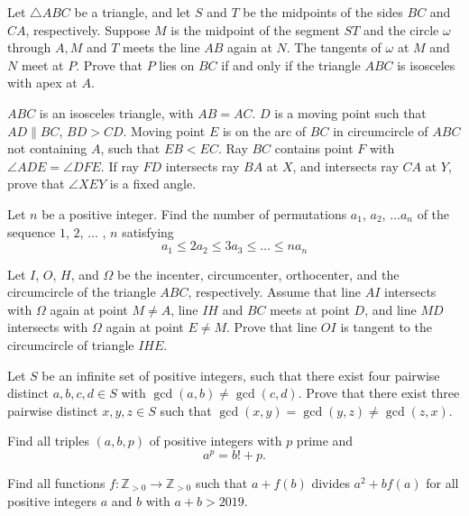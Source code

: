 \documentclass[11pt]{scrartcl}
\begin{document}
\begin{problem}[8639636622304457736]
Let $\triangle ABC$ be a triangle, and let $S$ and $T$ be the midpoints of the sides $BC$ and $CA$, respectively. Suppose $M$ is the midpoint of the segment $ST$ and the circle $\omega$ through $A, M$ and $T$ meets the line $AB$ again at $N$. The tangents of $\omega$ at $M$ and $N$ meet at $P$. Prove that $P$ lies on $BC$ if and only if the triangle $ABC$ is isosceles with apex at $A$.
\end{problem}
\begin{problem}[215375559035207]
$ABC$ is an isosceles triangle, with $AB=AC$. $D$ is a moving point such that $AD\parallel BC$, $BD>CD$. Moving point $E$ is on the arc of $BC$ in circumcircle of $ABC$ not containing $A$, such that $EB<EC$. Ray $BC$ contains point $F$ with $\angle ADE=\angle DFE$. If ray $FD$ intersects ray $BA$ at $X$, and intersects ray $CA$ at $Y$, prove that $\angle XEY$ is a fixed angle.
\end{problem}
\begin{problem}[233559801569582]
Let $n$ be a positive integer. Find the number of permutations $a_1$, $a_2$, $\dots a_n$ of the
sequence $1$, $2$, $\dots$ , $n$ satisfying
$$a_1 \le 2a_2\le 3a_3 \le \dots \le na_n$$
\end{problem}
\begin{problem}[183354438240037]
Let $I$, $O$, $H$, and $\Omega$ be the incenter, circumcenter, orthocenter, and the circumcircle of the triangle $ABC$, respectively. Assume that line $AI$ intersects with $\Omega$ again at point $M\neq A$, line $IH$ and $BC$ meets at point $D$, and line $MD$ intersects with $\Omega$ again at point $E\neq M$. Prove that line $OI$ is tangent to the circumcircle of triangle $IHE$.
\end{problem}
\begin{problem}[6783316811528119504]
Let $S$ be an infinite set of positive integers, such that there exist four pairwise distinct $a,b,c,d \in S$ with $\gcd(a,b) \neq \gcd(c,d)$. Prove that there exist three pairwise distinct $x,y,z \in S$ such that $\gcd(x,y)=\gcd(y,z) \neq \gcd(z,x)$.
\end{problem}
\begin{problem}[627600286851318227]
Find all triples $(a,b,p)$ of positive integers with $p$ prime and\[ a^p=b!+p. \]
\end{problem}
\begin{problem}[3435532350205377704]
Find all functions $f:\mathbb Z_{>0}\to \mathbb Z_{>0}$ such that $a+f(b)$ divides $a^2+bf(a)$ for all positive integers $a$ and $b$ with $a+b>2019$.
\end{problem}
\end{document}
